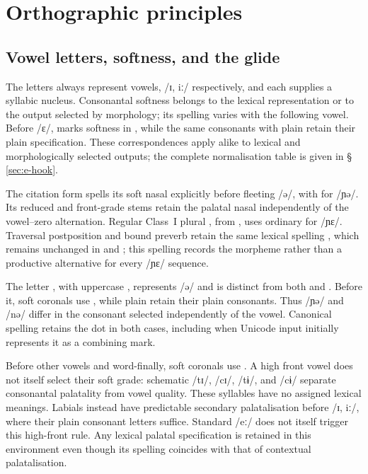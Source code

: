 \section{Orthographic principles}

\subsection{Vowel letters, softness, and the glide}\label{sec:orthographic-i}\label{sec:orthographic-e-hook}

The letters  always represent vowels, /ɪ, iː/ respectively,
and each supplies a syllabic nucleus. Consonantal softness belongs to the
lexical representation or to the output selected by morphology; its spelling
varies with the following vowel. Before /ɛ/,  marks softness in
, while the same consonants
with plain  retain their plain specification. These correspondences
apply alike to lexical and morphologically selected outputs; the complete
normalisation table is given in §\,\ref{sec:e-hook}.

The citation form   spells its
soft nasal explicitly before fleeting /ə/, with  for /ɲə/.
Its reduced  and front-grade  stems retain
the palatal nasal independently of the vowel--zero alternation.
Regular Class~I plural , from  ,
uses ordinary  for /ɲɛ/. Traversal postposition 
and bound preverb  retain the same lexical spelling ,
which remains unchanged in   and
 ; this spelling records the morpheme
rather than a productive alternative for every /ɲɛ/ sequence.

The letter , with uppercase , represents /ə/ and is
distinct from both  and . Before it, soft coronals
use , while plain 
retain their plain consonants. Thus  /ɲə/ and 
/nə/ differ in the consonant selected independently of the vowel.
Canonical spelling retains the dot in both cases, including when Unicode
input initially represents it as a combining mark.

Before other vowels and word-finally, soft coronals use .
A high front vowel does not itself select their soft grade: schematic
 /tɪ/,  /cɪ/,  /tɨ/, and  /cɨ/
separate consonantal palatality from vowel quality. These syllables have no
assigned lexical meanings. Labials instead have predictable secondary
palatalisation before /ɪ, iː/, where their plain consonant letters suffice.
Standard  /eː/ does not itself trigger this high-front rule.
Any lexical palatal specification is retained in this environment even
though its spelling coincides with that of contextual palatalisation.

